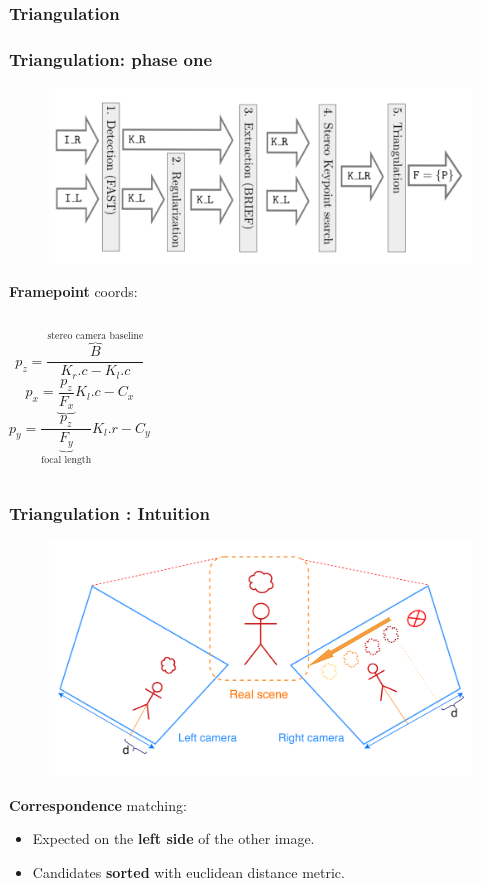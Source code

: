\documentclass[16pt]{beamer}
\begin{document}
\subsubsection*{Triangulation}
\begin{frame}
\frametitle{Triangulation: phase one}
  \begin{figure}
    \centering
    \includegraphics[width=.8\textwidth]{slam4}
  \end{figure}
  \textbf{Framepoint} coords:
  \begin{columns}
    \begin{equation}
      p_z = \frac{\overbrace{B}^{\text{stereo camera baseline}}}{K_r.c - K_l.c}
    \end{equation}
    \begin{equation}
      p_x = \frac{p_z}{\underbrace{F_x}}K_l.c - C_x
    \end{equation}
    \begin{equation}
      p_y = \frac{p_z}{\underbrace{F_y}_{\text{focal length}}}K_l.r - C_y
    \end{equation}
  \end{columns}
\end{frame}

\begin{frame}
  \frametitle{Triangulation : Intuition}
\begin{figure}
    \centering
    \includegraphics[width=.9\textwidth]{triangIntu}
  \end{figure}
  \begin{block}{\textbf{Correspondence} matching:}
    \begin{itemize}
      \item{Expected on the \textbf{left side} of the other image.}
      \item{Candidates \textbf{sorted} with euclidean distance metric.}
      \end{itemize}
  \end{block}
\end{frame}
\end{document}
